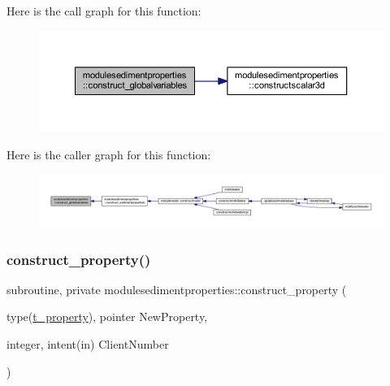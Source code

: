 Here is the call graph for this function\+:\nopagebreak
\begin{figure}[H]
\begin{center}
\leavevmode
\includegraphics[width=350pt]{namespacemodulesedimentproperties_ac04693b92d1ed98577124026a0fb1d2e_cgraph}
\end{center}
\end{figure}
Here is the caller graph for this function\+:\nopagebreak
\begin{figure}[H]
\begin{center}
\leavevmode
\includegraphics[width=350pt]{namespacemodulesedimentproperties_ac04693b92d1ed98577124026a0fb1d2e_icgraph}
\end{center}
\end{figure}
\mbox{\label{namespacemodulesedimentproperties_ab01eb007762b8ce8366245977a153ea9}} 
\subsubsection{\texorpdfstring{construct\+\_\+property()}{construct\_property()}}
{\footnotesize\ttfamily subroutine, private modulesedimentproperties\+::construct\+\_\+property (\begin{DoxyParamCaption}\item[{type(\mbox{\hyperlink{structmodulesedimentproperties_1_1t__property}{t\+\_\+property}}), pointer}]{New\+Property,  }\item[{integer, intent(in)}]{Client\+Number }\end{DoxyParamCaption})\hspace{0.3cm}{\ttfamily [private]}}

